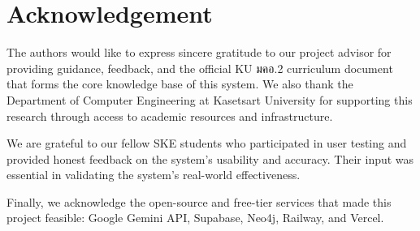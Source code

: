 \chapter*{Acknowledgement}
\label{chap:acknowledgement}

The authors would like to express sincere gratitude to our project advisor for providing guidance, feedback, and the official KU มคอ.2 curriculum document that forms the core knowledge base of this system. We also thank the Department of Computer Engineering at Kasetsart University for supporting this research through access to academic resources and infrastructure.

We are grateful to our fellow SKE students who participated in user testing and provided honest feedback on the system's usability and accuracy. Their input was essential in validating the system's real-world effectiveness.

Finally, we acknowledge the open-source and free-tier services that made this project feasible: Google Gemini API, Supabase, Neo4j, Railway, and Vercel.


\vspace{.2in}
\begin{flushright}
    \usevar{\srsAuthorOne} \\
    \usevar{\srsAuthorTwo}
\end{flushright}
